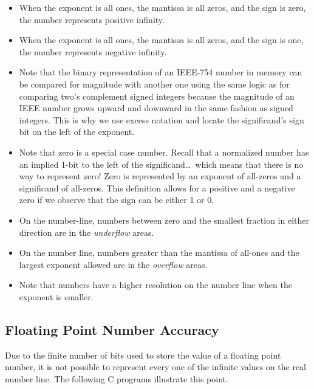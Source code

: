 \begin{itemize}
\item When the exponent is all ones, the mantissa is all zeros, and
the sign is zero, the number represents positive infinity.

\item When the exponent is all ones, the mantissa is all zeros, and
the sign is one, the number represents negative infinity.

\item Note that the binary representation of an IEEE-754 number in memory
can be compared for magnitude with another one using the same logic as for
comparing two's complement signed integers because the magnitude of an 
IEEE number grows upward and downward in the same fashion as signed integers.
This is why we use excess notation and locate the significand's sign bit on
the left of the exponent.

\item Note that zero is a special case number.  Recall that a normalized
number has an implied 1-bit to the left of the significand\ldots\ which
means that there is no way to represent zero!
Zero is represented by an exponent of all-zeros and a significand of 
all-zeros.  This definition allows for a positive and a negative zero 
if we observe that the sign can be either 1 or 0.

\item On the number-line, numbers between zero and the smallest fraction in 
either direction are in the {\em \gls{underflow}} areas.

\item On the number line, numbers greater than the mantissa of all-ones and the 
largest exponent allowed are in the {\em \gls{overflow}} areas.

\item Note that numbers have a higher resolution on the number line when the 
exponent is smaller.
\end{itemize}

\subsection{Floating Point Number Accuracy}
Due to the finite number of bits used to store the value of a floating point
number, it is not possible to represent every one of the infinite values
on the real number line.  The following C programs illustrate this point.

